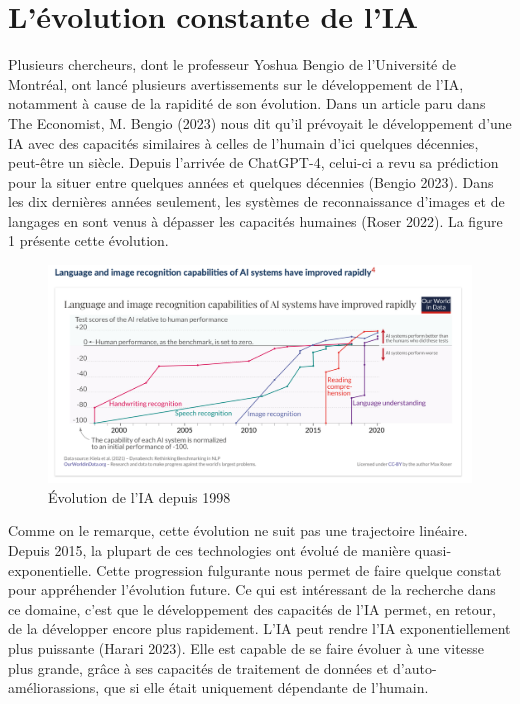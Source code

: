 \documentclass[
  letterpaper,
]{scrbook}
\begin{document}
\hypertarget{luxe9volution-constante-de-lia}{%
\section{L'évolution constante de
l'IA}\label{luxe9volution-constante-de-lia}}

Plusieurs chercheurs, dont le professeur Yoshua Bengio de l'Université
de Montréal, ont lancé plusieurs avertissements sur le développement de
l'IA, notamment à cause de la rapidité de son évolution. Dans un article
paru dans The Economist, M. Bengio (2023) nous dit qu'il prévoyait le
développement d'une IA avec des capacités similaires à celles de
l'humain d'ici quelques décennies, peut-être un siècle. Depuis l'arrivée
de ChatGPT-4, celui-ci a revu sa prédiction pour la situer entre
quelques années et quelques décennies (Bengio 2023). Dans les dix
dernières années seulement, les systèmes de reconnaissance d'images et
de langages en sont venus à dépasser les capacités humaines (Roser
2022). La figure 1 présente cette évolution.

\begin{figure}

{\centering \includegraphics{images/chapitre9_figure1.png}

}

\caption{Évolution de l'IA depuis 1998}

\end{figure}

\newpage{}

Comme on le remarque, cette évolution ne suit pas une trajectoire
linéaire. Depuis 2015, la plupart de ces technologies ont évolué de
manière quasi-exponentielle. Cette progression fulgurante nous permet de
faire quelque constat pour appréhender l'évolution future. Ce qui est
intéressant de la recherche dans ce domaine, c'est que le développement
des capacités de l'IA permet, en retour, de la développer encore plus
rapidement. L'IA peut rendre l'IA exponentiellement plus puissante
(Harari 2023). Elle est capable de se faire évoluer à une vitesse plus
grande, grâce à ses capacités de traitement de données et
d'auto-améliorassions, que si elle était uniquement dépendante de
l'humain.
\end{document}

